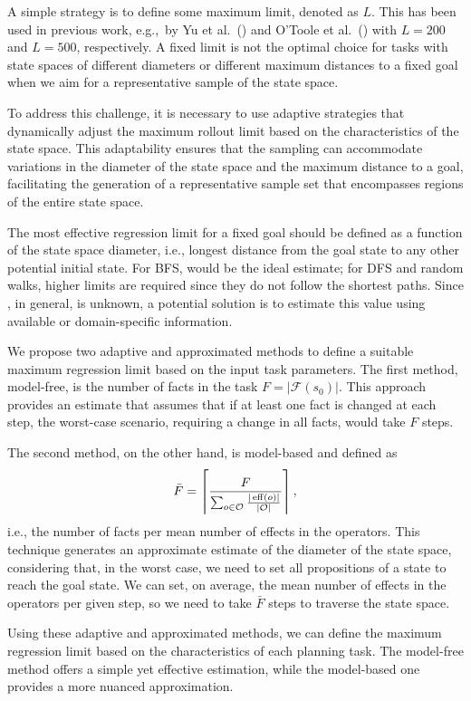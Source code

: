 A simple strategy is to define some maximum limit, denoted as $L$. This has been used in previous work, e.g.,~by Yu et al.~(\citeyear{Yu.etal/2020}) and O'Toole et al.~(\citeyear{OToole/2022}) with $L=200$ and $L=500$, respectively. A fixed limit is not the optimal choice for tasks with state spaces of different diameters or different maximum distances to a fixed goal when we aim for a representative sample of the state space.

To address this challenge, it is necessary to use adaptive strategies that dynamically adjust the maximum rollout limit based on the characteristics of the state space. This adaptability ensures that the sampling can accommodate variations in the diameter of the state space and the maximum distance to a goal, facilitating the generation of a representative sample set that encompasses regions of the entire state space.

The most effective regression limit for a fixed goal should be defined as a function of the state space diameter, i.e., longest distance \distfarthest from the goal state to any other potential initial state. For BFS, \distfarthest would be the ideal estimate; for DFS and random walks, higher limits are required since they do not follow the shortest paths.
Since \distfarthest, in general, is unknown, a potential solution is to estimate this value using available or domain-specific information.

We propose two adaptive and approximated methods to define a suitable maximum regression limit based on the input task parameters. The first method, model-free, is the number of facts in the task $F=|\mathcal{F}(s_0)|$. This approach provides an estimate that assumes that if at least one fact is changed at each step, the worst-case scenario, requiring a change in all facts, would take $F$ steps.

The second method, on the other hand, is model-based and defined as $$\bar F=\left\lceil \frac{F}{\sum_{o\in \mathcal{O}} \frac{|\operatorname{eff}(o)|}{|\mathcal{O}|}}\right\rceil,$$ i.e., the number of facts per mean number of effects in the operators. This technique generates an approximate estimate of the diameter of the state space, considering that, in the worst case, we need to set all propositions of a state to reach the goal state. We can set, on average, the mean number of effects in the operators per given step, so we need to take $\bar F$ steps to traverse the state space.

Using these adaptive and approximated methods, we can define the maximum regression limit based on the characteristics of each planning task. The model-free method offers a simple yet effective estimation, while the model-based one provides a more nuanced approximation.

